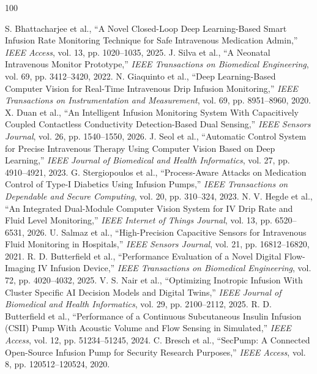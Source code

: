 \documentclass[journal]{IEEEtran}
\begin{document}
\begin{thebibliography}{100}

 S. Bhattacharjee et al., ``A Novel Closed-Loop Deep Learning-Based Smart Infusion Rate Monitoring Technique for Safe Intravenous Medication Admin,'' \emph{IEEE Access}, vol. 13, pp. 1020--1035, 2025.
 J. Silva et al., ``A Neonatal Intravenous Monitor Prototype,'' \emph{IEEE Transactions on Biomedical Engineering}, vol. 69, pp. 3412--3420, 2022.
 N. Giaquinto et al., ``Deep Learning-Based Computer Vision for Real-Time Intravenous Drip Infusion Monitoring,'' \emph{IEEE Transactions on Instrumentation and Measurement}, vol. 69, pp. 8951--8960, 2020.
 X. Duan et al., ``An Intelligent Infusion Monitoring System With Capacitively Coupled Contactless Conductivity Detection-Based Dual Sensing,'' \emph{IEEE Sensors Journal}, vol. 26, pp. 1540--1550, 2026.
 J. Seol et al., ``Automatic Control System for Precise Intravenous Therapy Using Computer Vision Based on Deep Learning,'' \emph{IEEE Journal of Biomedical and Health Informatics}, vol. 27, pp. 4910--4921, 2023.
 G. Stergiopoulos et al., ``Process-Aware Attacks on Medication Control of Type-I Diabetics Using Infusion Pumps,'' \emph{IEEE Transactions on Dependable and Secure Computing}, vol. 20, pp. 310--324, 2023.
 N. V. Hegde et al., ``An Integrated Dual-Module Computer Vision System for IV Drip Rate and Fluid Level Monitoring,'' \emph{IEEE Internet of Things Journal}, vol. 13, pp. 6520--6531, 2026.
 U. Salmaz et al., ``High-Precision Capacitive Sensors for Intravenous Fluid Monitoring in Hospitals,'' \emph{IEEE Sensors Journal}, vol. 21, pp. 16812--16820, 2021.
 R. D. Butterfield et al., ``Performance Evaluation of a Novel Digital Flow-Imaging IV Infusion Device,'' \emph{IEEE Transactions on Biomedical Engineering}, vol. 72, pp. 4020--4032, 2025.
 V. S. Nair et al., ``Optimizing Inotropic Infusion With Cluster Specific AI Decision Models and Digital Twins,'' \emph{IEEE Journal of Biomedical and Health Informatics}, vol. 29, pp. 2100--2112, 2025.
 R. D. Butterfield et al., ``Performance of a Continuous Subcutaneous Insulin Infusion (CSII) Pump With Acoustic Volume and Flow Sensing in Simulated,'' \emph{IEEE Access}, vol. 12, pp. 51234--51245, 2024.
 C. Bresch et al., ``SecPump: A Connected Open-Source Infusion Pump for Security Research Purposes,'' \emph{IEEE Access}, vol. 8, pp. 120512--120524, 2020.

\end{thebibliography}
\end{document}
